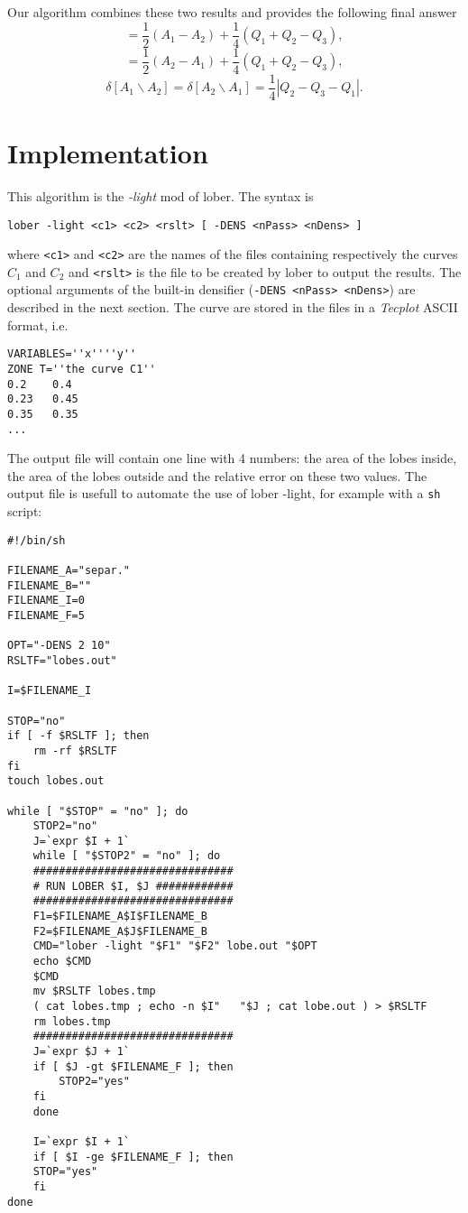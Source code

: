 \documentclass{article}
\begin{document}
Our algorithm combines these two results and provides the following final answer
\begin{equation}
[A_1 \backslash A_2]  =  \frac{1}{2} (A_1 - A_2) + \frac{1}{4} (Q_1+Q_2-Q_3) ,\end{equation}
\begin{equation}
[A_2 \backslash A_1]  =  \frac{1}{2} (A_2 - A_1) + \frac{1}{4} (Q_1+Q_2-Q_3) ,
\end{equation}
\begin{equation}
\delta [A_1 \backslash A_2]  =  \delta [A_2 \backslash A_1 ] = \frac{1}{4} \left| Q_2-Q_3-Q_1 \right| .
\end{equation}

\section{Implementation}

This algorithm is the {\em -light} mod of lober. The syntax is
\begin{verbatim}
lober -light <c1> <c2> <rslt> [ -DENS <nPass> <nDens> ]
\end{verbatim} where \verb+<c1>+ and \verb+<c2>+ are the names of the files containing respectively the curves $C_1$ and $C_2$ and \verb+<rslt>+ is the file to be created by lober to output the results. The optional arguments of the built-in densifier (\verb+-DENS <nPass> <nDens>+) are described in the next section.
The curve are stored in the files in a {\em Tecplot} ASCII format, i.e.
\begin{verbatim}
VARIABLES=''x''''y''
ZONE T=''the curve C1''
0.2    0.4
0.23   0.45
0.35   0.35
...
\end{verbatim}
The output file will contain one line with 4 numbers: the area of the lobes inside, the area of the lobes outside and the relative error on these two values. The output file is usefull to automate the use of lober -light, for example with a \verb+sh+ script:
\begin{verbatim}
#!/bin/sh

FILENAME_A="separ."
FILENAME_B=""
FILENAME_I=0
FILENAME_F=5

OPT="-DENS 2 10"
RSLTF="lobes.out"

I=$FILENAME_I

STOP="no"
if [ -f $RSLTF ]; then
    rm -rf $RSLTF
fi
touch lobes.out

while [ "$STOP" = "no" ]; do  
    STOP2="no"
    J=`expr $I + 1`
    while [ "$STOP2" = "no" ]; do
	###############################
	# RUN LOBER $I, $J ############
	###############################
	F1=$FILENAME_A$I$FILENAME_B
	F2=$FILENAME_A$J$FILENAME_B
	CMD="lober -light "$F1" "$F2" lobe.out "$OPT
	echo $CMD
	$CMD
	mv $RSLTF lobes.tmp
	( cat lobes.tmp ; echo -n $I"   "$J ; cat lobe.out ) > $RSLTF
	rm lobes.tmp
	###############################
	J=`expr $J + 1`
	if [ $J -gt $FILENAME_F ]; then
	    STOP2="yes"
	fi
    done

    I=`expr $I + 1`
    if [ $I -ge $FILENAME_F ]; then
	STOP="yes"
    fi
done
\end{verbatim}
\end{document}
